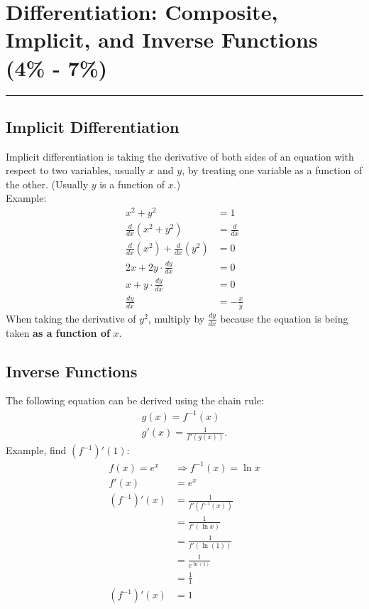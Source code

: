 \documentclass[12pt]{article}
\begin{document}
    \section{Differentiation: Composite, Implicit, and Inverse Functions (4\% - 7\%)}
    \par\noindent\rule{\textwidth}{0.1pt}
        \subsection{Implicit Differentiation}
            Implicit differentiation is taking the derivative of both sides of an equation with respect to two variables, usually $x$ and $y$, by treating one variable as a function of the other. (Usually $y$ is a function of $x$.)
            \\ Example:
            \begin{align*}
                x^2 + y^2 &= 1 \\
                \frac{d}{dx} \left( x^2 + y^2 \right) &= \frac{d}{dx} \\[6pt]
                \frac{d}{dx} \left( x^2 \right) + \frac{d}{dx} \left( y^2 \right) &= 0 \\[6pt]
                2x + 2y \cdot \frac{dy}{dx} &= 0 \\[6pt]
                x + y \cdot \frac{dy}{dx} &= 0 \\[6pt]
                \frac{dy}{dx} &= -\frac{x}{y}
            \end{align*}
            \newline
            When taking the derivative of $y^2$, multiply by $\frac{dy}{dx}$ because the equation is being taken \textbf{as a function of} $x$.

        \subsection{Inverse Functions}
            The following equation can be derived using the chain rule:
            \begin{gather*}
                g(x) = f^{-1}(x) \\
                g'(x) = \frac{1}{f'\left( g(x) \right)}.
            \end{gather*}
            \newline
            Example, find $(f^{-1})'(1)$:
            \begin{align*}
                f(x) = e^x &\Rightarrow f^{-1}(x) = \ln{x} \\
                f'(x) &= e^x \\
                (f^{-1})'(x) &= \frac{1}{f' \left( f^{-1}(x) \right)} \\[6pt]
                &= \frac{1}{f'(\ln{x})} \\[6pt]
                &= \frac{1}{f'(\ln{(1)})} \\[6pt]
                &= \frac{1}{e^{\ln{(1)}}} \\[6pt]
                &= \frac{1}{1} \\[6pt]
                (f^{-1})'(x) &= 1
            \end{align*}
\end{document}
